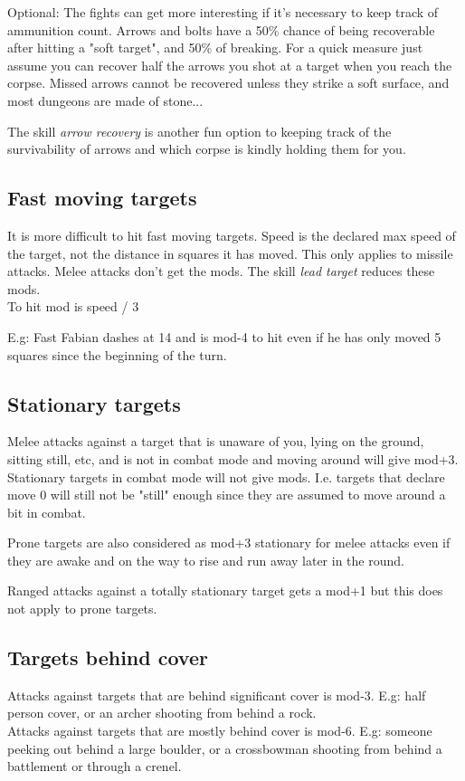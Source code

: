 Optional: The fights can get more interesting if it's necessary to keep track of ammunition count.
Arrows and bolts have a 50\% chance of being recoverable after hitting a "soft target", and 50\% of breaking. For a quick measure just assume you can recover half the arrows you shot at a target when you reach the corpse.
Missed arrows cannot be recovered unless they strike a soft surface, and most dungeons are made of stone...

The skill \emph{arrow recovery} is another fun option to keeping track of the survivability of arrows and which corpse is kindly holding them for you.


\subsection*{Fast moving targets}
It is more difficult to hit fast moving targets. Speed is the declared max speed of the target, not the distance in squares it has moved. This only applies to missile attacks. Melee attacks don't get the mods. The skill \emph{lead target} reduces these mods. \\
To hit mod is speed / 3

E.g: Fast Fabian dashes at 14 and is mod-4 to hit even if he has only moved 5 squares since the beginning of the turn.


\subsection*{Stationary targets}
Melee attacks against a target that is unaware of you, lying on the ground, sitting still, etc, and is not in combat mode and moving around will give mod+3. Stationary targets in combat mode will not give mods. I.e. targets that declare move 0 will still not be "still" enough since they are assumed to move around a bit in combat.

Prone targets are also considered as mod+3 stationary for melee attacks even if they are awake and on the way to rise and run away later in the round. 

Ranged attacks against a totally stationary target gets a mod+1 but this does not apply to prone targets.


\subsection*{Targets behind cover}
Attacks against targets that are behind significant cover is mod-3. E.g: half person cover, or an archer shooting from behind a rock. \\
Attacks against targets that are mostly behind cover is mod-6. E.g: someone peeking out behind a large boulder, or a crossbowman shooting from behind a battlement or through a crenel.


